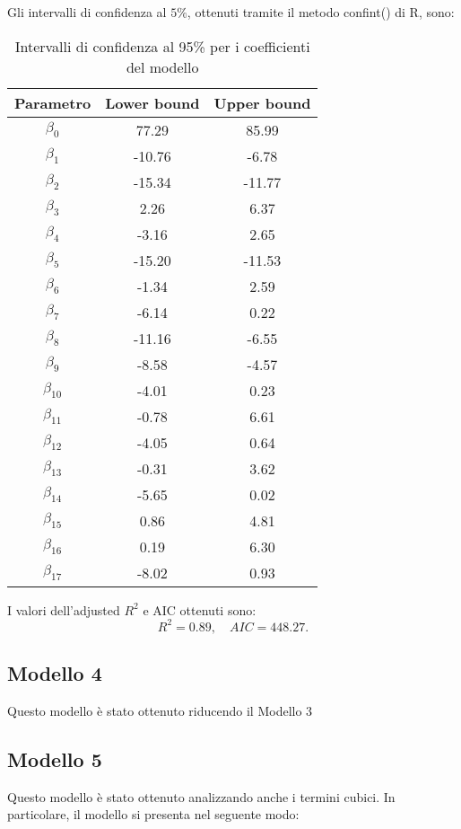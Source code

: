 Gli intervalli di confidenza al $5\%$, ottenuti tramite il metodo confint() di R, sono:
\begin{table}[H]
	\centering
	\begin{tabular}{|c|c|c|}
		\hline
		\textbf{Parametro} & \textbf{Lower bound} & \textbf{Upper bound} \\
		\hline
		$\beta_0$   & 77.29  & 85.99 \\
		$\beta_1$   & -10.76 & -6.78 \\
		$\beta_2$   & -15.34 & -11.77 \\
		$\beta_3$   & 2.26   & 6.37 \\
		$\beta_4$   & -3.16  & 2.65 \\
		$\beta_5$   & -15.20 & -11.53 \\
		$\beta_6$   & -1.34  & 2.59 \\
		$\beta_7$   & -6.14  & 0.22 \\
		$\beta_8$   & -11.16 & -6.55 \\
		$\beta_9$   & -8.58  & -4.57 \\
		$\beta_{10}$ & -4.01  & 0.23 \\
		$\beta_{11}$ & -0.78  & 6.61 \\
		$\beta_{12}$ & -4.05  & 0.64 \\
		$\beta_{13}$ & -0.31  & 3.62 \\
		$\beta_{14}$ & -5.65  & 0.02 \\
		$\beta_{15}$ & 0.86   & 4.81 \\
		$\beta_{16}$ & 0.19   & 6.30 \\
		$\beta_{17}$ & -8.02  & 0.93 \\
		\hline
	\end{tabular}
	\caption{Intervalli di confidenza al 95\% per i coefficienti del modello}
	\label{tab:ci_coefficienti}
\end{table}
I valori dell'adjusted $R^2$  e AIC ottenuti sono:
\begin{equation*}
	R^2 =      0.89, \quad AIC=448.27.
\end{equation*}

\subsection{Modello 4}
Questo modello è stato ottenuto riducendo il Modello 3


\subsection{Modello 5}
Questo modello è stato ottenuto analizzando anche i termini cubici. In particolare, il modello si presenta nel seguente modo:

